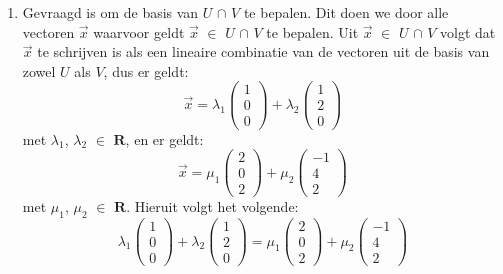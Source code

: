 \documentclass[12pt, a4paper]{article}
\begin{document}
\begin{enumerate}[(a.)]
\item 
Gevraagd is om de basis van $U$ $\cap$ $V$ te bepalen. Dit doen we door alle vectoren $\vec{x}$ waarvoor geldt $\vec{x}$ $\in$ $U$ $\cap$ $V$ te bepalen. Uit $\vec{x}$ $\in$ $U$ $\cap$ $V$ volgt dat $\vec{x}$ te schrijven is als een lineaire combinatie van de vectoren uit de basis van zowel $U$ als $V$, dus er geldt: 
\begin{equation}
    \vec{x} = 
    \lambda_1
    \begin{pmatrix}
        1\\
        0\\
        0
    \end{pmatrix} 
    + \lambda_2
    \begin{pmatrix}
        1\\
        2\\
        0
    \end{pmatrix}    
\end{equation}
met $\lambda_1$, $\lambda_2$ $\in$ $\mathbf{R}$, en er geldt:
\begin{equation}
    \vec{x} = \mu_1
    \begin{pmatrix}
        2\\
        0\\
        2
    \end{pmatrix} 
    + \mu_2
    \begin{pmatrix}
        -1\\
        4\\
        2
    \end{pmatrix} 
\end{equation}
met $\mu_1$, $\mu_2$ $\in$ $\mathbf{R}$. Hieruit volgt het volgende:
\begin{equation}
    \lambda_1
    \begin{pmatrix}
        1\\
        0\\
        0
    \end{pmatrix} 
    + \lambda_2
    \begin{pmatrix}
        1\\
        2\\
        0
    \end{pmatrix}
    = 
    \mu_1
    \begin{pmatrix}
        2\\
        0\\
        2
    \end{pmatrix} 
    + \mu_2
    \begin{pmatrix}
        -1\\
        4\\
        2
    \end{pmatrix} 
\end{equation}


\end{enumerate}
\end{document}
